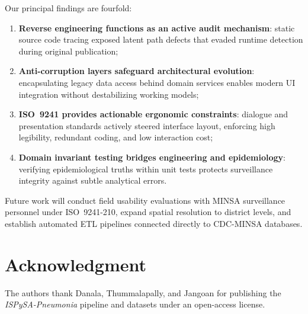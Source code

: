 \documentclass[conference]{IEEEtran}
\begin{document}
Our principal findings are fourfold:
\begin{enumerate}
  \item \textbf{Reverse engineering functions as an active audit mechanism}: static source code tracing exposed latent path defects that evaded runtime detection during original publication;
  \item \textbf{Anti-corruption layers safeguard architectural evolution}: encapsulating legacy data access behind domain services enables modern UI integration without destabilizing working models;
  \item \textbf{ISO~9241 provides actionable ergonomic constraints}: dialogue and presentation standards actively steered interface layout, enforcing high legibility, redundant coding, and low interaction cost;
  \item \textbf{Domain invariant testing bridges engineering and epidemiology}: verifying epidemiological truths within unit tests protects surveillance integrity against subtle analytical errors.
\end{enumerate}

Future work will conduct field usability evaluations with MINSA surveillance personnel under ISO~9241-210, expand spatial resolution to district levels, and establish automated ETL pipelines connected directly to CDC-MINSA databases.

\section*{Acknowledgment}

The authors thank Danala, Thummalapally, and Jangoan for publishing the \textit{ISPySA-Pneumonia} pipeline and datasets under an open-access license.

\balance
\end{document}
